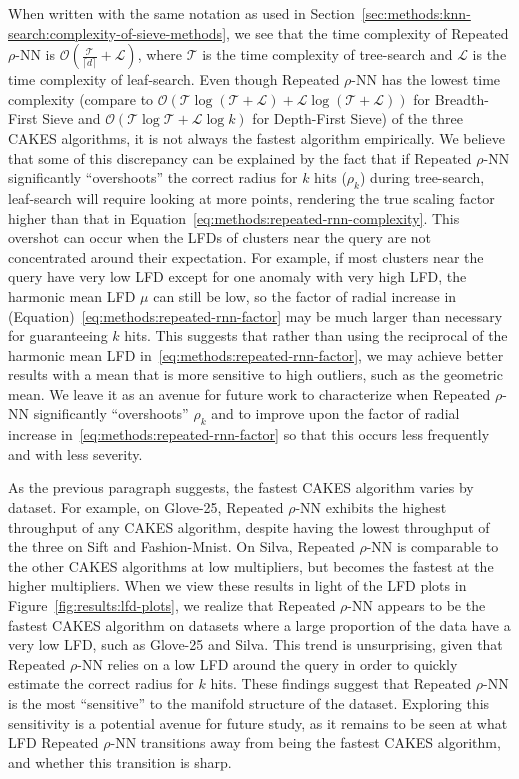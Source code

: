 When written with the same notation as used in Section~\ref{sec:methods:knn-search:complexity-of-sieve-methods}, we see that the time complexity of Repeated $\rho$-NN is $\mathcal{O}(\tfrac{\mathcal{T}}{\lceil d \rceil} + \mathcal{L})$, where $\mathcal{T}$ is the time complexity of tree-search and $\mathcal{L}$ is the time complexity of leaf-search.
Even though Repeated $\rho$-NN has the lowest time complexity (compare to $\mathcal{O}(\mathcal{T}\log{(\mathcal{T}+\mathcal{L})} + \mathcal{L}\log{(\mathcal{T}+\mathcal{L})})$ for Breadth-First Sieve and $\mathcal{O}(\mathcal{T}\log{\mathcal{T}} + \mathcal{L}\log{k})$ for Depth-First Sieve) of the three CAKES algorithms, it is not always the fastest algorithm empirically.
We believe that some of this discrepancy can be explained by the fact that if Repeated $\rho$-NN significantly ``overshoots'' the correct radius for $k$ hits ($\rho_k$) during tree-search, leaf-search will require looking at more points, rendering the true scaling factor higher than that in Equation~\ref{eq:methods:repeated-rnn-complexity}.
This overshot can occur when the LFDs of clusters near the query are not concentrated around their expectation.
For example, if most clusters near the query have very low LFD except for one anomaly with very high LFD,
the harmonic mean LFD $\mu$ can still be low, so the factor of radial increase in (Equation)~\ref{eq:methods:repeated-rnn-factor} may be much larger than necessary for guaranteeing $k$ hits.
This suggests that rather than using the reciprocal of the harmonic mean LFD in~\ref{eq:methods:repeated-rnn-factor}, we may achieve better results with a mean that is more sensitive to high outliers, such as the geometric mean.
We leave it as an avenue for future work to characterize when Repeated $\rho$-NN significantly ``overshoots'' $\rho_k$ and to improve upon the factor of radial increase in~\ref{eq:methods:repeated-rnn-factor} so that this occurs less frequently and with less severity.

As the previous paragraph suggests, the fastest CAKES algorithm varies by dataset.
For example, on Glove-25, Repeated $\rho$-NN exhibits the highest throughput of any CAKES algorithm, despite having the lowest throughput of the three on Sift and Fashion-Mnist.
On Silva, Repeated $\rho$-NN is comparable to the other CAKES algorithms at low multipliers, but becomes the fastest at the higher multipliers.
When we view these results in light of the LFD plots in Figure~\ref{fig:results:lfd-plots}, we realize that Repeated $\rho$-NN appears to be the fastest CAKES algorithm on datasets where a large proportion of the data have a very low LFD, such as Glove-25 and Silva.
This trend is unsurprising, given that Repeated $\rho$-NN relies on a low LFD around the query in order to quickly estimate the correct radius for $k$ hits.
These findings suggest that Repeated $\rho$-NN is the most ``sensitive'' to the manifold structure of the dataset.
Exploring this sensitivity is a potential avenue for future study, as it remains to be seen at what LFD Repeated $\rho$-NN transitions away from being the fastest CAKES algorithm, and whether this transition is sharp.


